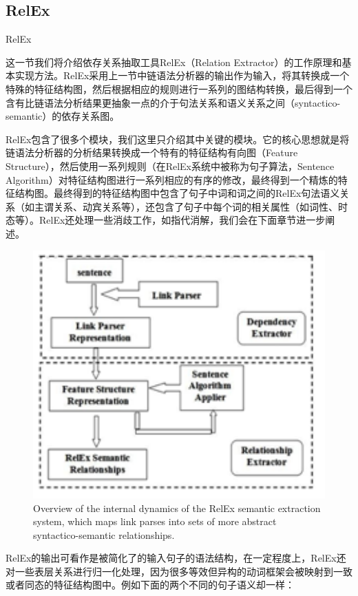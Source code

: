 \subsection{RelEx}{RelEx}

这一节我们将介绍依存关系抽取工具RelEx（Relation Extractor）的工作原理和基本实现方法。RelEx采用上一节中链语法分析器的输出作为输入，将其转换成一个特殊的特征结构图，然后根据相应的规则进行一系列的图结构转换，最后得到一个含有比链语法分析结果更抽象一点的介于句法关系和语义关系之间（syntactico-semantic）的依存关系图。

RelEx包含了很多个模块，我们这里只介绍其中关键的模块。它的核心思想就是将链语法分析器的分析结果转换成一个特有的特征结构有向图（Feature Structure），然后使用一系列规则（在RelEx系统中被称为句子算法，Sentence Algorithm）对特征结构图进行一系列相应的有序的修改，最终得到一个精炼的特征结构图。最终得到的特征结构图中包含了句子中词和词之间的RelEx句法语义关系（如主谓关系、动宾关系等），还包含了句子中每个词的相关属性（如词性、时态等）。RelEx还处理一些消歧工作，如指代消解，我们会在下面章节进一步阐述。

\begin{figure}
\begin{centering}
\includegraphics[width=12cm]{figures/RelEx.png}
\protect\caption{\label{fig:relex}Overview of the internal dynamics of the RelEx semantic extraction system, which maps link parses into sets of more abstract syntactico-semantic relationships.}
\end{centering}
\end{figure}

RelEx的输出可看作是被简化了的输入句子的语法结构，在一定程度上，RelEx还对一些表层关系进行归一化处理，因为很多等效但异构的动词框架会被映射到一致或者同态的特征结构图中。例如下面的两个不同的句子语义却一样：

